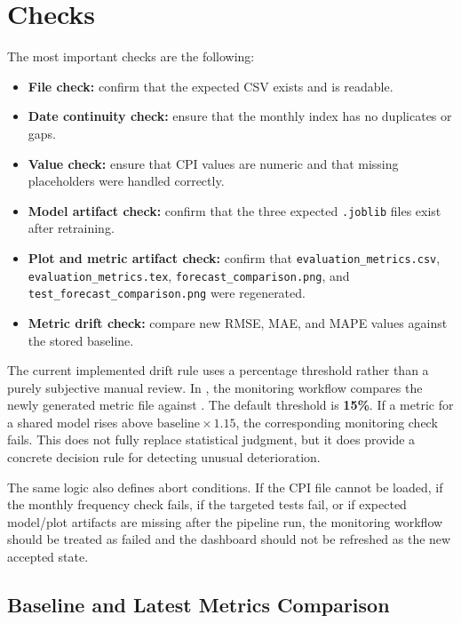 \section{Checks}

The most important checks are the following:

\begin{itemize}
	\item \textbf{File check:} confirm that the expected CSV exists and is readable.
	\item \textbf{Date continuity check:} ensure that the monthly index has no duplicates or gaps.
	\item \textbf{Value check:} ensure that CPI values are numeric and that missing placeholders were handled correctly.
	\item \textbf{Model artifact check:} confirm that the three expected \texttt{.joblib} files exist after retraining.
	\item \textbf{Plot and metric artifact check:} confirm that \texttt{evaluation\_metrics.csv}, \texttt{evaluation\_metrics.tex}, \texttt{forecast\_comparison.png}, and \texttt{test\_forecast\_comparison.png} were regenerated.
	\item \textbf{Metric drift check:} compare new RMSE, MAE, and MAPE values against the stored baseline.
\end{itemize}

The current implemented drift rule uses a percentage threshold rather than a purely subjective manual review. In , the monitoring workflow compares the newly generated metric file against . The default threshold is \textbf{15\%}. If a metric for a shared model rises above \textbf{$\mathrm{baseline} \times 1.15$}, the corresponding monitoring check fails. This does not fully replace statistical judgment, but it does provide a concrete decision rule for detecting unusual deterioration.

The same logic also defines abort conditions. If the CPI file cannot be loaded, if the monthly frequency check fails, if the targeted tests fail, or if expected model/plot artifacts are missing after the pipeline run, the monitoring workflow should be treated as failed and the dashboard should not be refreshed as the new accepted state.

\subsection{Baseline and Latest Metrics Comparison}

